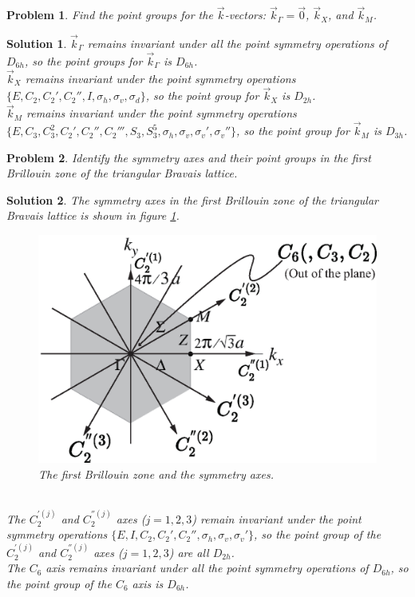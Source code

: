 \documentclass[UTF8,10pt,a4paper]{article}
\theoremstyle{Problem}
\newtheorem{prob}{Problem}
\theoremstyle{Solution}
\newtheorem*{sol}{Solution}
\begin{document}
\begin{prob}
    Find the point groups for the $\vec{k}$-vectors: $\vec{k}_{\Gamma}=\vec{0}$, $\vec{k}_X$, and $\vec{k}_M$.
\end{prob}
\begin{sol}
    $\vec{k}_{\Gamma}$ remains invariant under all the point symmetry operations of $D_{6h}$, so the point groups for $\vec{k}_{\Gamma}$ is $D_{6h}$.\\
    $\vec{k}_X$ remains invariant under the point symmetry operations $\{E,C_2,C_2',C_2'',I,\sigma_h,\sigma_v,\sigma_d\}$, so the point group for $\vec{k}_X$ is $D_{2h}$.\\
    $\vec{k}_M$ remains invariant under the point symmetry operations $\{E,C_3,C_3^2,C_2',C_2'',C_2''',S_3,S_3^5,\sigma_h,\sigma_v,\sigma_v',\sigma_v''\}$, so the point group for $\vec{k}_M$ is $D_{3h}$.
\end{sol}

\begin{prob}
    Identify the symmetry axes and their point groups in the first Brillouin zone of the triangular Bravais lattice.
\end{prob}
\begin{sol}
    The symmetry axes in the first Brillouin zone of the triangular Bravais lattice is shown in figure \ref{5-FBSA}.
    \begin{figure}[h]
        \centering
        \includegraphics[width=.45\textwidth]{5-Gamma.eps}
        \caption{The first Brillouin zone and the symmetry axes.}
        \label{5-FBSA}
    \end{figure}
    \\The $C_2^{'(j)}$ and $C_2^{''(j)}$ axes ($j=1,2,3$) remain invariant under the point symmetry operations $\{E,I,C_2,C_2',C_2'',\sigma_h,\sigma_v,\sigma_v'\}$, so the point group of the $C_2^{'(j)}$ and $C_2^{''(j)}$ axes ($j=1,2,3$) are all $D_{2h}$.\\
    The $C_6$ axis remains invariant under all the point symmetry operations of $D_{6h}$, so the point group of the $C_6$ axis is $D_{6h}$.
\end{sol}
\end{document}
